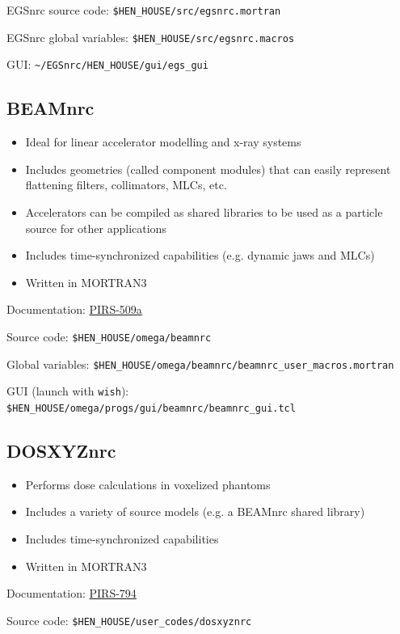 \documentclass[12pt,twoside]{article}
\begin{document}
EGSnrc source code: \Verb+$HEN_HOUSE/src/egsnrc.mortran+

EGSnrc global variables: \Verb+$HEN_HOUSE/src/egsnrc.macros+

GUI: \Verb+~/EGSnrc/HEN_HOUSE/gui/egs_gui+

\subsection{BEAMnrc}
\begin{itemize}
\item Ideal for linear accelerator modelling and x-ray systems
\item Includes geometries (called component modules) that can easily represent flattening filters, collimators, MLCs, etc.
\item Accelerators can be compiled as shared libraries to be used as a particle source for other applications
\item Includes time-synchronized capabilities (e.g. dynamic jaws and MLCs)
\item Written in MORTRAN3
\end{itemize}

Documentation: \href{http://nrc-cnrc.github.io/EGSnrc/doc/pirs509a-beamnrc.pdf}{PIRS-509a}

Source code: \Verb+$HEN_HOUSE/omega/beamnrc+

Global variables: \Verb+$HEN_HOUSE/omega/beamnrc/beamnrc_user_macros.mortran+

GUI (launch with \Verb+wish+): \Verb+$HEN_HOUSE/omega/progs/gui/beamnrc/beamnrc_gui.tcl+

\subsection{DOSXYZnrc}
\begin{itemize}
\item Performs dose calculations in voxelized phantoms
\item Includes a variety of source models (e.g. a BEAMnrc shared library)
\item Includes time-synchronized capabilities
\item Written in MORTRAN3
\end{itemize}

Documentation: \href{http://nrc-cnrc.github.io/EGSnrc/doc/pirs794-dosxyznrc.pdf}{PIRS-794}

Source code: \Verb+$HEN_HOUSE/user_codes/dosxyznrc+
\end{document}
